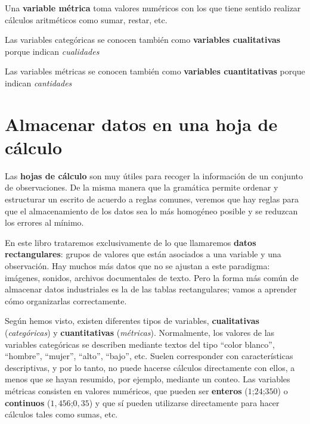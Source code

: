 \documentclass[
  letterpaper,
]{scrbook}
\begin{document}
Una \textbf{variable métrica} toma valores numéricos con los que tiene
sentido realizar cálculos aritméticos como sumar, restar, etc.

Las variables categóricas se conocen también como \textbf{variables
cualitativas} porque indican \emph{cualidades}

Las variables métricas se conocen también como \textbf{variables
cuantitativas} porque indican \emph{cantidades}


\hypertarget{almacenar-datos-en-una-hoja-de-cuxe1lculo}{%
\section{Almacenar datos en una hoja de
cálculo}\label{almacenar-datos-en-una-hoja-de-cuxe1lculo}}

Las \textbf{hojas de cálculo} son muy útiles para recoger la información
de un conjunto de observaciones. De la misma manera que la gramática
permite ordenar y estructurar un escrito de acuerdo a reglas comunes,
veremos que hay reglas para que el almacenamiento de los datos sea lo
más homogéneo posible y se reduzcan los errores al mínimo.

En este libro trataremos exclusivamente de lo que llamaremos
\textbf{datos rectangulares}: grupos de valores que están asociados a
una variable y una observación. Hay muchos más datos que no se ajustan a
este paradigma: imágenes, sonidos, archivos documentales de texto. Pero
la forma más común de almacenar datos industriales es la de las tablas
rectangulares; vamos a aprender cómo organizarlas correctamente.

Según hemos visto, existen diferentes tipos de variables,
\textbf{cualitativas} (\emph{categóricas}) y \textbf{cuantitativas}
(\emph{métricas}). Normalmente, los valores de las variables categóricas
se describen mediante textos del tipo ``color blanco'', ``hombre'',
``mujer'', ``alto'', ``bajo'', etc. Suelen corresponder con
características descriptivas, y por lo tanto, no puede hacerse cálculos
directamente con ellos, a menos que se hayan resumido, por ejemplo,
mediante un conteo. Las variables métricas consisten en valores
numéricos, que pueden ser \textbf{enteros} (\(1\);\(24\);\(350\)) o
\textbf{continuos} (\(1,456\);\(0,35\)) y que sí pueden utilizarse
directamente para hacer cálculos tales como sumas, etc.
\end{document}
